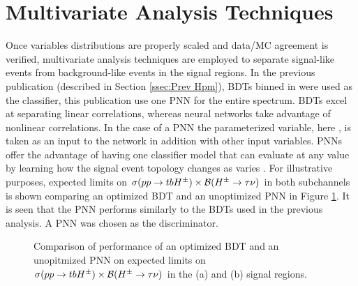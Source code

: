	\section{Multivariate Analysis Techniques}\label{sec:mva}
		Once variables distributions are properly scaled and data/MC agreement is verified, multivariate analysis techniques are employed to separate signal-like events from background-like events in the signal regions. In the previous publication (described in Section \ref{ssec:Prev Hpm}), BDTs binned in \mHpm were used as the classifier, this publication use one PNN for the entire \mHpm spectrum. BDTs excel at separating linear correlations, whereas neural networks take advantage of nonlinear correlations. In the case of a PNN the parameterized variable, here \mHpm, is taken as an input to the network in addition with other input variables. PNNs offer the advantage of having one classifier model that can evaluate at any \mHpm value by learning how the signal event topology changes as \mHpm varies \cite{PNN}. For illustrative purposes, expected limits on $\sigma(pp\to tbH^{\pm})\times \mathrm{\cal{B}}(H^{\pm} \to \tau \nu)$ in both subchannels is shown comparing an optimized BDT and an unoptimized PNN in Figure \ref{fig:bdt-vs-pnn-expected-limits}. It is seen that the PNN performs similarly to the BDTs used in the previous analysis. A PNN was chosen as the discriminator. 

		\begin{figure}
		\caption{Comparison of performance of an optimized BDT and an unopitmized PNN on expected limits on $\sigma(pp\to tbH^{\pm})\times \mathrm{\cal{B}}(H^{\pm} \to \tau \nu)$ in the \taujets (a) and \taulep (b) signal regions. }
		\label{fig:bdt-vs-pnn-expected-limits}
		\end{figure}

